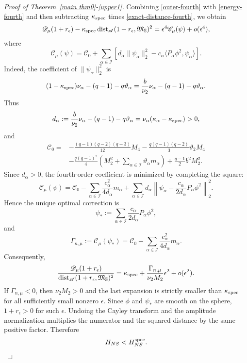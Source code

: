 \documentclass[11pt]{article}
\begin{document}
\begin{proof}[Proof of Theorem~\ref{main thm0}-\eqref{upper1}]
Combining \eqref{outer-fourth} with \eqref{energy-fourth} and then subtracting $\kappa_{\rm spec}$ times \eqref{exact-distance-fourth}, we obtain
\begin{equation*}
 \mathscr D_\mu(1+r_\epsilon)-\kappa_{\rm spec}\operatorname{dist}_{\mathscr A}(1+r_\epsilon,\mathfrak M_{\mathbb S})^2
 =\epsilon^4\mathscr C_\mu(\psi)+o(\epsilon^4),
\end{equation*}
where
\begin{equation*}
 \mathscr C_\mu(\psi)=\mathscr C_0+
 \sum_{\alpha\in\mathcal I}\left[d_\alpha\|\psi_\alpha\|_2^2-c_\alpha\langle P_\alpha\phi^2,\psi_\alpha\rangle\right].
\end{equation*}
Indeed, the coefficient of $\|\psi_\alpha\|_2^2$ is
\[
(1-\kappa_{\rm spec})\nu_\alpha-(q-1)-q\vartheta_\alpha
=\frac b{\nu_2}\nu_\alpha-(q-1)-q\vartheta_\alpha.
\]
Thus
\begin{equation}\label{dc-def}
 d_\alpha:=\frac b{\nu_2}\nu_\alpha-(q-1)-q\vartheta_\alpha
 =\nu_\alpha(\kappa_\alpha-\kappa_{\rm spec})>0,
\end{equation}
\endgroup
and
\begin{align}\label{C0-def}
 \mathscr C_0={}&-\frac{(q-1)(q-2)(q-3)}{12}M_4
 -\frac{q(q-1)(q-2)}3\vartheta_2M_4\nonumber\\
 &-\frac{q(q-1)^2}{4}\left(M_2^2+\sum_{\alpha\in\mathcal I}\vartheta_\alpha m_\alpha\right)
 +\frac{q-1}{2}b^2M_2^2.
\end{align}
\begingroup
Since $d_\alpha>0$, the fourth-order coefficient is minimized by completing the square:
\[
\mathscr C_\mu(\psi)
=\mathscr C_0-\sum_{\alpha\in\mathcal I}\frac{c_\alpha^2}{4d_\alpha}m_\alpha
+\sum_{\alpha\in\mathcal I}d_\alpha
\left\|\psi_\alpha-\frac{c_\alpha}{2d_\alpha}P_\alpha\phi^2\right\|_2^2.
\]
Hence the unique optimal correction is
\[
 \psi_*:=\sum_{\alpha\in\mathcal I}\frac{c_\alpha}{2d_\alpha}P_\alpha\phi^2,
\]
and
\begin{equation}\label{Gamma-def}
 \Gamma_{n,\mu}:=\mathscr C_\mu(\psi_*)
 =\mathscr C_0-\sum_{\alpha\in\mathcal I}\frac{c_\alpha^2}{4d_\alpha}m_\alpha.
\end{equation}
\endgroup
Consequently,
\begin{equation*}
 \frac{\mathscr D_\mu(1+r_\epsilon)}{\operatorname{dist}_{\mathscr A}(1+r_\epsilon,\mathfrak M_{\mathbb S})^2}
 =\kappa_{\rm spec}+\frac{\Gamma_{n,\mu}}{\nu_2M_2}\epsilon^2+o(\epsilon^2).
\end{equation*}
If $\Gamma_{n,\mu}<0$, then $\nu_2M_2>0$ and the last expansion is strictly smaller than $\kappa_{\rm spec}$ for all sufficiently small nonzero $\epsilon$. Since $\phi$ and $\psi_*$ are smooth on the sphere, $1+r_\epsilon>0$ for such $\epsilon$. Undoing the Cayley transform and the amplitude normalization multiplies the numerator and the squared distance by the same positive factor. Therefore
\[
H_{NS}<H_{NS}^{\rm spec}.
\]

\end{proof}
\end{document}
